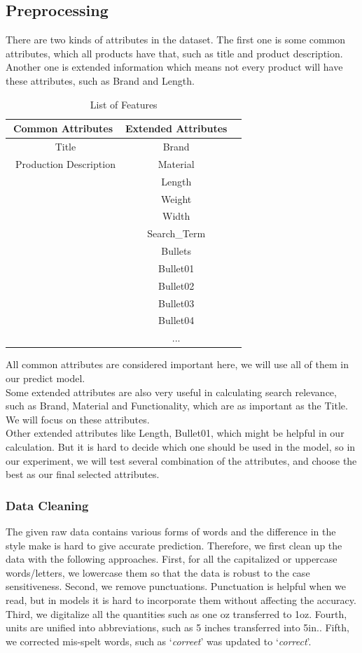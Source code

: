 \documentclass{sig-alternate-05-2015}
\begin{document}
\subsection{Preprocessing}
There are two kinds of attributes in the dataset. The first one is some common attributes, which all products have that, such as title and product description. Another one is extended information which means not every product will have these attributes, such as Brand and Length.\\
\begin{table}[ht]
\centering
\caption{List of Features}
\begin{tabular}{|c|c|l|} \hline
Common Attributes & Extended Attributes \\\hline
\ Title & Brand\\
\ Production Description & Material \\
\  & Length\\ 
\   & Weight\\ 
\   & Width\\
\   & Search\_Term\\
\   & Bullets \\
\   & Bullet01\\
\   & Bullet02\\
\   & Bullet03\\
\   & Bullet04\\
\  & ... \\ \hline\end{tabular}
\end{table}

All common attributes are considered important here, we will use all of them in our predict model.\\

Some extended attributes are also very useful in calculating search relevance, such as Brand, Material and Functionality, which are as important as the Title. We will focus on these attributes.\\

Other extended attributes like Length, Bullet01, which might be helpful in our calculation. But it is hard to decide which one should be used in the model, so in our experiment, we will test several combination of the attributes, and choose the best as our final selected attributes.

\subsubsection{Data Cleaning}
The given raw data contains various forms of words and the difference in the style make is hard to give accurate prediction. Therefore, we first clean up the data with the following approaches. First, for all the capitalized or uppercase words/letters, we lowercase them so that the data is robust to the case sensitiveness. Second, we remove punctuations. Punctuation is helpful when we read, but in models it is hard to incorporate them without affecting the accuracy. Third, we digitalize all the quantities such as one oz transferred to 1oz. Fourth, units are unified into abbreviations, such as 5 inches transferred into 5in.. Fifth, we corrected mis-spelt words, such as \lq \textit{correet}' was updated to \lq \textit{correct}'. 
\end{document}
